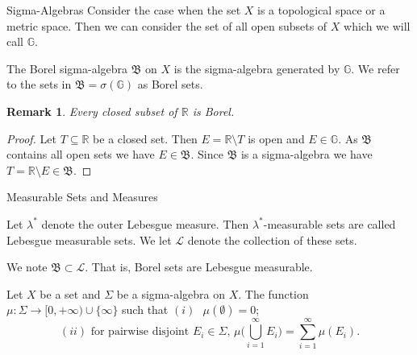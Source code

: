 \documentclass{beamer}
\newtheorem*{remark}{Remark}
\begin{document}
\begin{frame}{Sigma-Algebras}
Consider the case when the set $X$ is a topological space or a metric space. Then we can consider the set of all open subsets of $X$ which we will call $\mathbb{G}$. 
\begin{definition}
The Borel sigma-algebra $\mathfrak{B}$ on $X$ is the sigma-algebra generated by $\mathbb{G}$. We refer to the sets in $\mathfrak{B}=\sigma(\mathbb{G})$ as Borel sets.
\end{definition}

\begin{remark}
Every closed subset of $\mathbb{R}$ is Borel.
\end{remark}
\begin{proof}
Let $T\subseteq\mathbb{R}$ be a closed set. Then $E=\mathbb{R}\setminus T$ is open and $E\in\mathbb{G}$. As $\mathfrak{B}$ contains all open sets we have $E\in\mathfrak{B}$. Since $\mathfrak{B}$ is a sigma-algebra we have $T=\mathbb{R}\setminus E\in\mathfrak{B}$.
\end{proof}

\end{frame} 

\begin{frame}{Measurable Sets and Measures}

\begin{definition}
Let $\lambda^{*}$ denote the outer Lebesgue measure. Then $\lambda^{*}$-measurable sets are called Lebesgue measurable sets. We let $\mathcal{L}$ denote the collection of these sets.
\end{definition}
We note $\mathfrak{B}\subset\mathcal{L}$. That is, Borel sets are Lebesgue measurable. 

\begin{definition}[Measure]
Let $X$ be a set and $\Sigma$ be a sigma-algebra on $X$. The function $\mu:\Sigma\to[0,+\infty)\cup\{\infty\}$ such that 
$(i)\text{ } \mu(\emptyset)=0$; 
$$(ii)\text{ for pairwise disjoint } E_{i}\in\Sigma\text{, }  \mu\big(\bigcup_{i=1}^{\infty}E_{i}\big)=\sum_{i=1}^{\infty}\mu(E_{i}).$$

\end{definition}

\end{frame}
\end{document}
